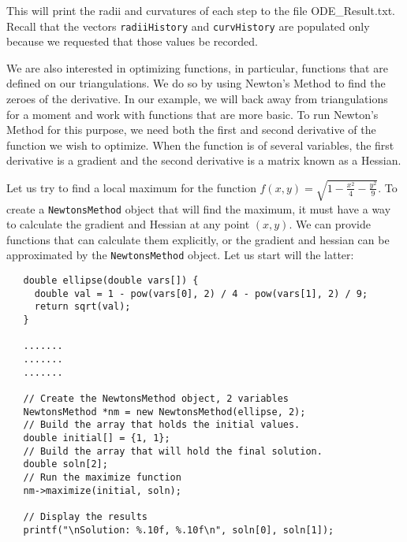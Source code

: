 \documentclass{amsart}
\theoremstyle{plain}
\numberwithin{equation}{section}
\begin{document}
\bigskip

This will print the radii and curvatures of each step to the file ODE\_Result.txt. Recall that the vectors \verb|radiiHistory| and \verb|curvHistory| are populated only because we requested that those values be recorded. \newline

We are also interested in optimizing functions, in particular, functions that are defined on our triangulations. We do so by using Newton's Method to find the zeroes of the derivative. In our example, we will back away from triangulations for a moment and work with functions that are more basic. To run Newton's Method for this purpose, we need both the first and second derivative of the function we wish to optimize. When the function is of several variables, the first derivative is a gradient and the second derivative is a matrix known as a Hessian. \newline

Let us try to find a local maximum for the function $f(x,y) = \sqrt{1-\frac{x^2}{4} - \frac{y^2}{9}}$. To create a \verb|NewtonsMethod| object that will find the maximum, it must have a way to calculate the gradient and Hessian at any point $(x,y)$. We can provide functions that can calculate them explicitly, or the gradient and hessian can be approximated by the \verb|NewtonsMethod| object. Let us start will the latter:\newline

\begin{verbatim}
   double ellipse(double vars[]) {
     double val = 1 - pow(vars[0], 2) / 4 - pow(vars[1], 2) / 9;
     return sqrt(val);
   }

   .......
   .......
   .......
	 
   // Create the NewtonsMethod object, 2 variables
   NewtonsMethod *nm = new NewtonsMethod(ellipse, 2);
   // Build the array that holds the initial values.
   double initial[] = {1, 1};
   // Build the array that will hold the final solution.
   double soln[2];
   // Run the maximize function
   nm->maximize(initial, soln);

   // Display the results
   printf("\nSolution: %.10f, %.10f\n", soln[0], soln[1]);
\end{verbatim}

\bigskip
\end{document}
